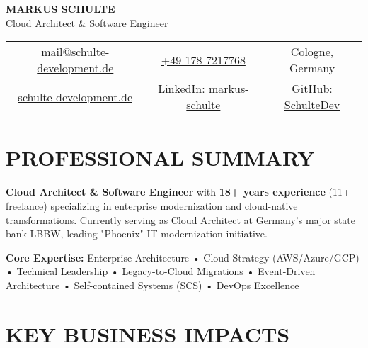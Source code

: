 \documentclass[10pt,a4paper]{article}
\begin{document}
\begin{center}
    {\Huge\bfseries\color{darkblue} MARKUS SCHULTE}\\[4pt]
    {\Large\color{mediumgray} Cloud Architect \& Software Engineer}\\[8pt]
    
    \begin{tabular}{c|c|c}
        \href{mailto:mail@schulte-development.de}{mail@schulte-development.de} & 
        \href{tel:+4917872177768}{+49 178 7217768} & 
        Cologne, Germany \\[2pt]
        \href{https://schulte-development.de}{schulte-development.de} & 
        \href{https://www.linkedin.com/in/markus-schulte/}{LinkedIn: markus-schulte} & 
        \href{https://github.com/SchulteDev}{GitHub: SchulteDev}
    \end{tabular}
\end{center}

\vspace{8pt}

\section{PROFESSIONAL SUMMARY}

\textbf{Cloud Architect \& Software Engineer} with \textbf{18+ years experience} (11+ freelance) specializing in enterprise modernization and cloud-native transformations. Currently serving as Cloud Architect at Germany's major state bank LBBW, leading "Phoenix" IT modernization initiative.

\textbf{Core Expertise:} Enterprise Architecture • Cloud Strategy (AWS/Azure/GCP) • Technical Leadership • Legacy-to-Cloud Migrations • Event-Driven Architecture • Self-contained Systems (SCS) • DevOps Excellence

\vspace{6pt}

\section{KEY BUSINESS IMPACTS}
\end{document}
